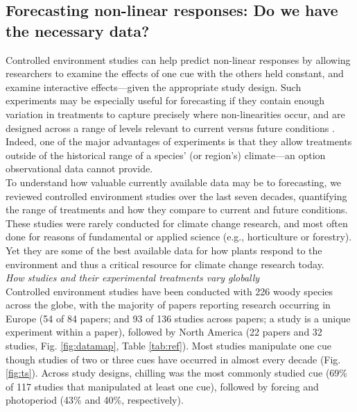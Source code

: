 \documentclass[11pt,letter]{article}
\begin{document}
\subsection{Forecasting non-linear responses: Do we have the necessary data?} %
Controlled environment studies can help predict non-linear responses by allowing researchers to examine the effects of one cue with the others held constant, and examine interactive effects---given the appropriate study design. Such experiments may be especially useful for forecasting if they contain enough variation in treatments to capture precisely where non-linearities occur, and are designed across a range of levels relevant to current versus future conditions \citep{shen2015}. Indeed, one of the major advantages of experiments is that they allow treatments outside of the historical range of a species' (or region's) climate---an option observational data cannot provide. \\

To understand how valuable currently available data may be to forecasting, we reviewed controlled environment studies over the last seven decades, quantifying the range of treatments and how they compare to current and future conditions. These studies were rarely conducted for climate change research, and most often done for reasons of fundamental or applied science (e.g., horticulture or forestry). Yet they are some of the best available data for how plants respond to the environment and thus a critical resource for climate change research today.\\

\emph{How studies and their experimental treatments vary globally}\\
Controlled environment studies have been conducted with 226 woody species across the globe, with the majority of papers reporting research occurring in Europe (54 of 84 papers; and 93 of 136 studies across papers; a study is a unique experiment within a paper), followed by North America (22 papers and 32 studies, Fig. \ref{fig:datamap}, Table \ref{tab:ref}). Most studies manipulate one cue though studies of two or three cues have occurred in almost every decade (Fig. \ref{fig:ts}). Across study designs, chilling was the most commonly studied cue (69\% of 117 studies that manipulated at least one cue), followed by forcing and photoperiod (43\% and 40\%, respectively). \\
\end{document}
